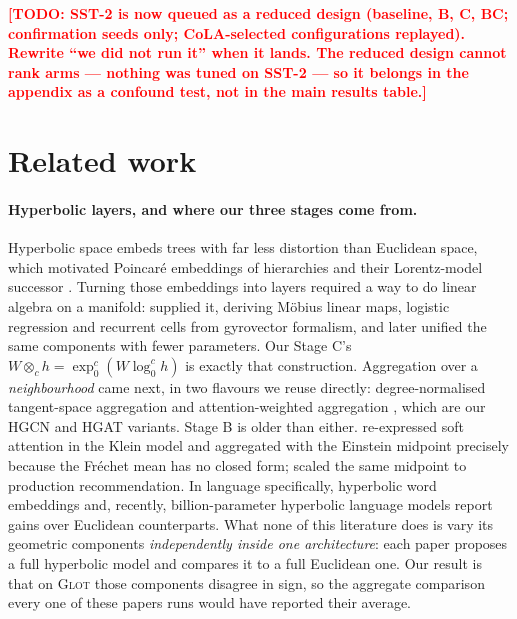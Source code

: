 \documentclass{article}
\newcommand{\TODO}[1]{\textcolor{red}{\textbf{[TODO: #1]}}}
\begin{document}
\TODO{SST-2 is now queued as a reduced design (baseline, B, C, BC; confirmation
seeds only; CoLA-selected configurations replayed). Rewrite ``we did not run
it'' when it lands. The reduced design cannot rank arms --- nothing was tuned
on SST-2 --- so it belongs in the appendix as a confound test, not in the main
results table.}

\section{Related work}
\label{sec:related}

\paragraph{Hyperbolic layers, and where our three stages come from.} Hyperbolic
space embeds trees with far less distortion than Euclidean space, which
motivated Poincar\'e embeddings of hierarchies \citep{nickel2017poincare} and
their Lorentz-model successor \citep{nickel2018lorentz}. Turning those
embeddings into layers required a way to do linear algebra on a manifold:
\citet{ganea2018hyperbolic} supplied it, deriving M\"obius linear maps,
logistic regression and recurrent cells from gyrovector formalism, and
\citet{shimizu2021hnnpp} later unified the same components with fewer
parameters. Our Stage C's $W \otimes_c h = \exp^c_0(W\log^c_0 h)$ is exactly
that construction. Aggregation over a \emph{neighbourhood} came next, in two
flavours we reuse directly: degree-normalised tangent-space aggregation
\citep{chami2019hgcn,liu2019hgnn} and attention-weighted aggregation
\citep{zhang2019hgat}, which are our HGCN and HGAT variants. Stage B is older
than either. \citet{gulcehre2018hyperbolicattention} re-expressed soft attention
in the Klein model and aggregated with the Einstein midpoint precisely because
the Fr\'echet mean has no closed form; \citet{chamberlain2019scalable} scaled
the same midpoint to production recommendation. In language specifically,
hyperbolic word embeddings \citep{tifrea2018poincareglove} and, recently,
billion-parameter hyperbolic language models \citep{he2025helm} report gains
over Euclidean counterparts. What none of this literature does is vary its
geometric components \emph{independently inside one architecture}: each paper
proposes a full hyperbolic model and compares it to a full Euclidean one. Our
result is that on \textsc{Glot} those components disagree in sign, so the
aggregate comparison every one of these papers runs would have reported their
average.
\end{document}
